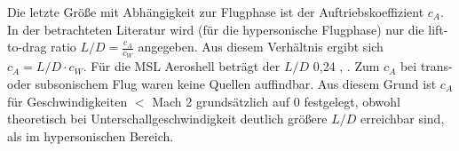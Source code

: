 Die letzte Größe mit Abhängigkeit zur Flugphase ist der Auftriebskoeffizient $c_A$. In der betrachteten Literatur wird (für die hypersonische Flugphase) nur die lift-to-drag ratio $L/D = \frac{c_A}{c_W}$ angegeben. Aus diesem Verhältnis ergibt sich $c_A = L/D \cdot c_W$. Für die MSL Aeroshell beträgt der $L/D$ 0,24 \cite{Way2007}, \cite{Edquist2009}. Zum $c_A$ bei trans- oder subsonischem Flug waren keine Quellen auffindbar. Aus diesem Grund ist $c_A$ für Geschwindigkeiten $<$ Mach 2 grund\-sätz\-lich auf 0 festgelegt, obwohl theoretisch bei Unterschallgeschwindigkeit deutlich größere $L/D$ erreichbar sind, als im hypersonischen Bereich.